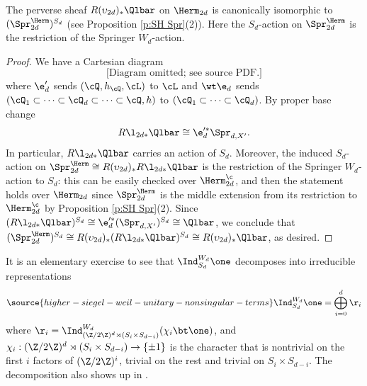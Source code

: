 \begin{lemma}
\notready\label{l:Lag push}
The perverse sheaf $R(\upsilon_{2d})_{*}\Qlbar$ on $\Herm_{2d}$ is canonically isomorphic to $(\Spr^{\Herm}_{2d})^{S_{d}}$ (see Proposition \ref{p:SH Spr}(2)). Here the $S_{d}$-action on $\Spr^{\Herm}_{2d}$ is the restriction of the Springer $W_{d}$-action.
\end{lemma}
\begin{proof} We have a Cartesian diagram
\begin{equation}
\text{[Diagram omitted; see source PDF.]}
\end{equation}
where $\e'_{d}$ sends $(\cQ,h_{\cQ},\cL)$ to $\cL$ and $\wt\e_{d}$ sends $(\cQ_{1}\subset \cdots\subset\cQ_{d}\subset \cdots\subset \cQ,h)$ to $(\cQ_{1}\subset \cdots\subset\cQ_{d})$. By proper base change
\begin{equation}
R\l_{2d*}\Qlbar\cong \e'^{*}_{d}\Spr_{d, X'}.
\end{equation}
In particular, $R\l_{2d*}\Qlbar$ carries an action of $S_{d}$. Moreover, the induced $S_{d}$-action  on  $\Spr^{\Herm}_{2d}\cong R(\upsilon_{2d})_{*}R\l_{2d*}\Qlbar$ is  the restriction  of the Springer $W_{d}$-action to $S_{d}$:  this can be easily checked over $\Herm^{\c}_{2d}$, and then the statement holds over $\Herm_{2d}$ since $\Spr^{\Herm}_{2d}$ is the middle extension from its restriction to $\Herm^{\c}_{2d}$ by Proposition \ref{p:SH Spr}(2). Since  $(R\l_{2d*}\Qlbar)^{S_{d}}\cong \e'^{*}_{d}(\Spr_{d,X'})^{S_{d}}\cong \Qlbar$, we conclude that $(\Spr^{\Herm}_{2d})^{S_{d}}\cong R(\upsilon_{2d})_{*}(R\l_{2d*}\Qlbar)^{S_{d}}\cong R(\upsilon_{2d})_{*}\Qlbar$, as desired.
\end{proof}

It is an elementary exercise to see that $\Ind_{S_{d}}^{W_{d}}\one$ decomposes into irreducible representations
\begin{equation}\label{rho i}
\source{higher-siegel-weil-unitary-nonsingular-terms}
\Ind_{S_{d}}^{W_{d}}\one=\bigoplus_{i=0}^{d}\r_{i}
\end{equation}
where $\r_{i}=\Ind^{W_{d}}_{(\Z/2\Z)^{d}\rtimes (S_{i}\times S_{d-i})}(\chi_{i}\bt \one)$, and $\chi_{i}: (\Z/2\Z)^{d}\rtimes (S_{i}\times S_{d-i})\to \{\pm1\}$ is the character that is nontrivial on the first $i$ factors of $(\Z/2\Z)^{i}$, trivial on the rest and trivial on $S_{i}\times S_{d-i}$.  The decomposition also shows up in \cite[\S8.1.1]{YZ}.

